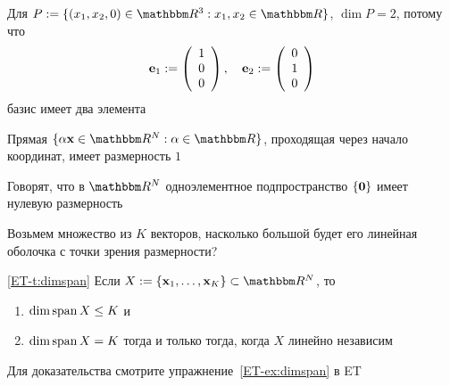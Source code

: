 \begin{frame}
    
    \vspace{2em}
    \Eg
    Для $P := \setntn{(x_1, x_2, 0) \in \RR^3}{ x_1, x_2 \in \RR}$, $\dim P = 2$, 
    потому что
    \begin{equation*}
        {\mathbf e}_1 := 
        \left(
        \begin{array}{c}
            1 \\
            0 \\
            0
        \end{array}
        \right),
        \quad 
        {\mathbf e}_2 := 
        \left(
        \begin{array}{c}
            0 \\
            1 \\
            0
        \end{array}
        \right)
    \end{equation*}
    базис имеет два элемента
    
    \vspace{.7em}
    \Eg
    Прямая $\setntn{\alpha \boldx \in \RR^N}{\alpha \in \RR}$, проходящая через начало координат, имеет размерность $1$
    
\end{frame}

\begin{frame}

    \vspace{2em}
    Говорят, что в $\RR^N$ одноэлементное подпространство $\{{\mathbf 0}\}$ имеет 
    нулевую размерность
    
    Возьмем множество из $K$ векторов, насколько большой будет его 
    линейная оболочка с точки зрения размерности?  
    
    \vspace{.7em}
    \Thm\eqref{ET-t:dimspan}
        Если $X := \{\boldx_1,\ldots,\boldx_K\} \subset \RR^N$, то
        \begin{enumerate}
            \item $\dim \operatorname{span} X \leq K$ и
            \item $\dim \operatorname{span} X = K$ тогда и только тогда, когда $X$ линейно независим
        \end{enumerate}
    Для доказательства смотрите упражнение~\ref{ET-ex:dimspan} в ET
    
\end{frame}

